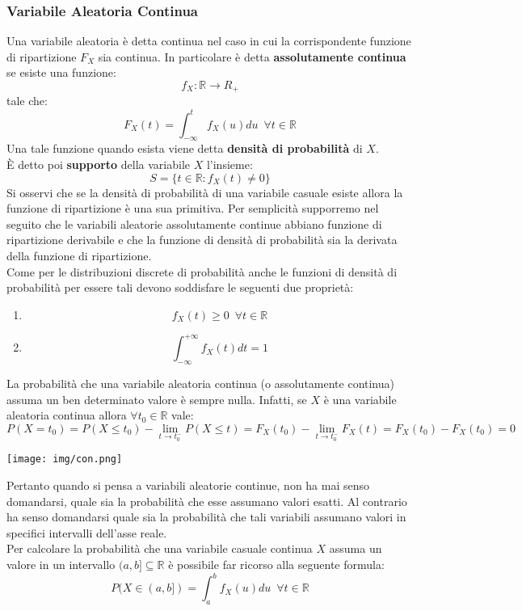 \documentclass[a4paper,12pt, oneside]{book}
\begin{document}
\subsubsection{Variabile Aleatoria Continua}
Una variabile aleatoria è detta continua nel caso in cui la corrispondente funzione di ripartizione $F_X$ sia continua. In particolare è detta \textbf{assolutamente continua} se esiste una funzione:
\[f_X:\mathbb{R}\to R_+\]
tale che:
\[F_X(t)=\int_{-\infty}^t f_X(u)du\,\,\,\forall t\in \mathbb{R}\]
Una tale funzione quando esista viene detta \textbf{densità di probabilità }di $X$.\\
È detto poi \textbf{supporto} della variabile $X$ l'insieme:
\[S=\{t\in\mathbb{R}:f_X(t)\neq 0\}\]
Si osservi che se la densità di probabilità di una variabile casuale esiste allora la
funzione di ripartizione è una sua primitiva.
Per semplicità supporremo nel seguito che le variabili aleatorie assolutamente
continue abbiano funzione di ripartizione derivabile e che la funzione di densità di
probabilità sia la derivata della funzione di ripartizione.\\
Come per le distribuzioni discrete di probabilità anche le funzioni di densità di
probabilità per essere tali devono soddisfare le seguenti due proprietà:
\begin{enumerate}
\item \[f_X(t)\geq 0\,\,\, \forall t\in \mathbb{R}\]
\item \[\int_{-\infty}^{+\infty}f_X(t)dt=1\]
\end{enumerate}
La probabilità che una variabile aleatoria continua (o
assolutamente continua) assuma un ben determinato valore è sempre nulla. Infatti, se $X$ è una variabile aleatoria continua allora $\forall t_0\in \mathbb{R}$ vale:
\[P(X=t_0)=P(X\leq t_0)-\lim_{t\to t_0^-}P(X\leq t)=F_X(t_0)-\lim_{t\to t_0^-} F_X(t)=F_X(t_0)-F_X(t_0)=0\]
\begin{center}
\texttt{[image: img/con.png]}
\end{center}
Pertanto quando si pensa a variabili aleatorie continue, non ha mai senso domandarsi, quale sia la probabilità che esse assumano valori esatti. Al contrario ha senso domandarsi quale sia la probabilità che tali variabili assumano
valori in specifici intervalli dell'asse reale.\\
Per calcolare la probabilità che una variabile casuale continua $X$ assuma un valore in un intervallo $(a,b]\subseteq \mathbb{R}$ è possibile far ricorso alla seguente formula:
\[P(X\in(a,b])=\int_a^b f_X(u)du\,\,\, \forall t\in\mathbb{R}\]
\end{document}
